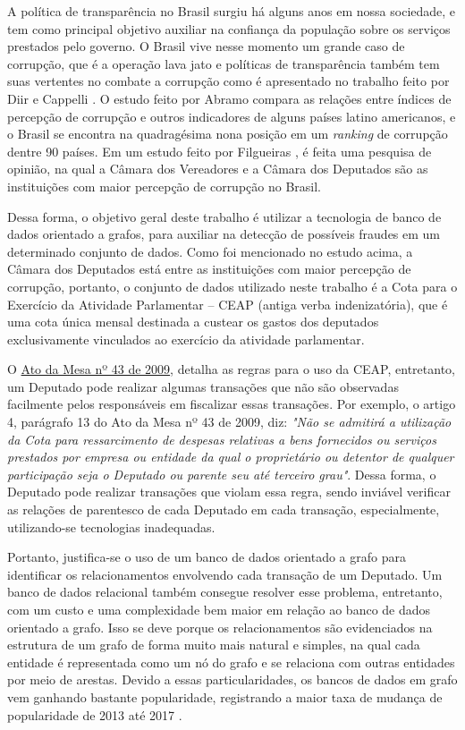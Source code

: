 \label{chap:1}

	A política de transparência no Brasil surgiu há alguns anos em nossa sociedade, e tem como principal objetivo auxiliar na confiança da população sobre os serviços prestados pelo governo. O Brasil vive nesse momento um grande caso de corrupção, que é a operação lava jato e políticas de transparência também tem suas vertentes no combate a corrupção como é apresentado no trabalho feito por Diir e Cappelli \cite{diirrcombate}. O estudo feito por Abramo \cite{abramo2000relaccoes} compara as relações entre índices de percepção de corrupção
e outros indicadores de alguns países latino americanos, e o Brasil se encontra na quadragésima nona posição em um \textit{ranking} de corrupção dentre 90 países. Em um estudo feito por Filgueiras \cite{filgueiras2009tolerancia}, é feita uma pesquisa de opinião, na qual a Câmara dos Vereadores e a Câmara dos Deputados são as instituições com maior percepção de corrupção no Brasil.

	Dessa forma, o objetivo geral deste trabalho é utilizar a tecnologia de banco de dados orientado a grafos, para auxiliar na detecção de possíveis fraudes em um determinado conjunto de dados. Como foi mencionado no estudo acima, a Câmara dos Deputados está entre as instituições com maior percepção de corrupção, portanto, o conjunto de dados utilizado neste trabalho é a Cota para o Exercício da Atividade Parlamentar – CEAP (antiga verba indenizatória), que é uma cota única mensal destinada a custear os gastos dos deputados exclusivamente vinculados ao exercício da atividade parlamentar.
	
	O \href{http://www2.camara.leg.br/legin/int/atomes/2009/atodamesa-43-21-maio-2009-588364-norma-cd-mesa.html}{Ato da Mesa nº 43 de 2009}, detalha as regras para o uso da CEAP, entretanto, um Deputado pode realizar algumas transações que não são observadas facilmente pelos responsáveis em fiscalizar essas transações. Por exemplo, o artigo 4, parágrafo 13 do Ato da Mesa nº 43 de 2009, diz: \textit{"Não se admitirá a utilização da Cota para ressarcimento de despesas relativas  a bens fornecidos ou serviços prestados por empresa ou entidade da qual o proprietário ou detentor de qualquer participação seja o Deputado ou parente seu até terceiro grau"}. Dessa forma, o Deputado pode realizar transações que violam essa regra, sendo inviável verificar as relações de parentesco de cada Deputado em cada transação, especialmente, utilizando-se tecnologias inadequadas.
	
	Portanto, justifica-se o uso de um banco de dados orientado a grafo para identificar os relacionamentos envolvendo cada transação de um Deputado. Um banco de dados relacional também consegue resolver esse problema, entretanto, com um custo e uma complexidade bem maior em relação ao banco de dados orientado a grafo. Isso se deve porque os relacionamentos são evidenciados na estrutura de um grafo de forma muito mais natural e simples, na qual cada entidade é representada como um nó do grafo e se relaciona com outras entidades por meio de arestas. Devido a essas particularidades, os bancos de dados em grafo vem ganhando bastante popularidade, registrando a maior taxa de mudança de popularidade de 2013 até 2017 \cite{Dbmspopularity}.
	
